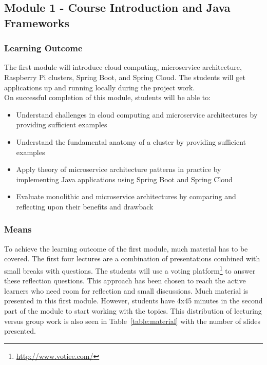 \subsection*{Module 1 - Course Introduction and Java Frameworks}

\subsubsection*{Learning Outcome}
The first module will introduce cloud computing, microservice architecture, Raspberry Pi clusters, Spring Boot, and Spring Cloud. The students will get applications up and running locally during the project work. \\

\noindent
On successful completion of this module, students will be able to:
\begin{itemize}
\setlength\itemsep{0.05em}
    \item Understand challenges in cloud computing and microservice architectures by providing sufficient examples
    \item Understand the fundamental anatomy of a cluster by providing sufficient examples
    \item Apply theory of microservice architecture patterns in practice by implementing Java applications using Spring Boot and Spring Cloud 
    \item Evaluate monolithic and microservice architectures by comparing and reflecting upon their benefits and drawback 
\end{itemize}

\subsubsection*{Means}

To achieve the learning outcome of the first module, much material has to be covered. The first four lectures are a combination of presentations combined with small breaks with questions. The students will use a voting platform\footnote{\url{http://www.votiee.com/}} to answer these reflection questions. This approach has been chosen to reach the active learners who need room for reflection and small discussions. Much material is presented in this first module. However, students have 4x45 minutes in the second part of the module to start working with the topics. This distribution of lecturing versus group work is also seen in Table~\ref{table:material} with the number of slides presented.

